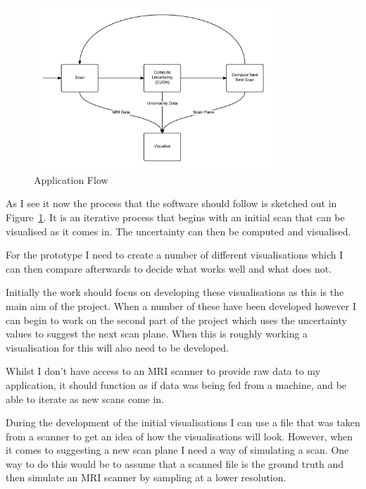 \documentclass[
  oneside,
  11pt, a4paper,
  footinclude=true,
  headinclude=true,
  cleardoublepage=empty
]{scrbook}
\begin{document}
\begin{figure}[h]
    \centering
	\includegraphics[width=0.8\textwidth]{images/flowchart.png}
    \caption{Application Flow}
    \label{fig:flowchart}
\end{figure}

As I see it now the process that the software should follow is sketched out in Figure~\ref{fig:flowchart}. It is an iterative process that begins with an initial scan that can be visualised as it comes in. The uncertainty can then be computed and visualised.

For the prototype I need to create a number of different visualisations which I can then compare afterwards to decide what works well and what does not.

Initially the work should focus on developing these visualisations as this is the main aim of the project. When a number of these have been developed however I can begin to work on the second part of the project which uses the uncertainty values to suggest the next scan plane. When this is roughly working a visualisation for this will also need to be developed.

Whilst I don’t have access to an MRI scanner to provide raw data to my application, it should function as if data was being fed from a machine, and be able to iterate as new scans come in.

During the development of the initial visualisations I can use a file that was taken from a scanner to get an idea of how the visualisations will look. However, when it comes to suggesting a new scan plane I need a way of simulating a scan. One way to do this would be to assume that a scanned file is the ground truth and then simulate an MRI scanner by sampling at a lower resolution.
\end{document}
